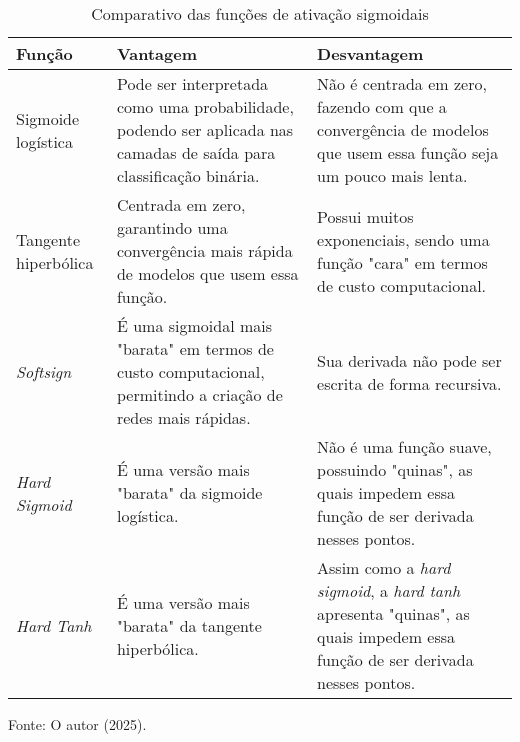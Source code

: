 \begin{table}[htbp]
    \centering
    \begin{threeparttable}
        \caption{Comparativo das funções de ativação sigmoidais}
        \label{tab:comparativo-funcoes-sigmoidais}
        \begin{tabularx}{\textwidth}{p{3.2cm} *{2}{>{\raggedright\arraybackslash}X}}
            \toprule
            \textbf{Função} & \textbf{Vantagem} & \textbf{Desvantagem} \\
            \midrule
            Sigmoide logística & Pode ser interpretada como uma probabilidade, podendo ser aplicada nas camadas de saída para classificação binária. & Não é centrada em zero, fazendo com que a convergência de modelos que usem essa função seja um pouco mais lenta. \\
            \addlinespace
            Tangente hiperbólica & Centrada em zero, garantindo uma convergência mais rápida de modelos que usem essa função. & Possui muitos exponenciais, sendo uma função "cara" em termos de custo computacional. \\
            \addlinespace
            \textit{Softsign} & É uma sigmoidal mais "barata" em termos de custo computacional, permitindo a criação de redes mais rápidas. & Sua derivada não pode ser escrita de forma recursiva. \\
            \addlinespace
            \textit{Hard Sigmoid} & É uma versão mais "barata" da sigmoide logística. & Não é uma função suave, possuindo "quinas", as quais impedem essa função de ser derivada nesses pontos. \\
            \addlinespace
            \textit{Hard Tanh} & É uma versão mais "barata" da tangente hiperbólica. & Assim como a \textit{hard sigmoid}, a \textit{hard tanh} apresenta "quinas", as quais impedem essa função de ser derivada nesses pontos. \\
        \end{tabularx}
        
        \begin{tablenotes}[para]
            \small
            \item[] Fonte: O autor (2025).
        \end{tablenotes}

    \end{threeparttable}
\end{table}